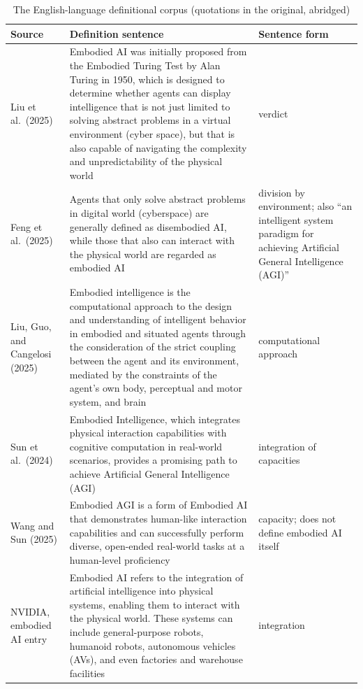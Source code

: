 \documentclass[10pt]{article}
\begin{document}
\begin{table}[htbp]
\centering
\caption{The English-language definitional corpus (quotations in the original, abridged)}
\label{tab:englishdefinitions}
\footnotesize
\begin{tabularx}{\textwidth}{>{\raggedright\arraybackslash}p{3.3cm}Y>{\raggedright\arraybackslash}p{2.6cm}}
\toprule
Source & Definition sentence & Sentence form \\
\midrule
Liu et al.\ (2025) \cite{liu2024survey} & Embodied AI was initially proposed from the Embodied Turing Test by Alan Turing in 1950, which is designed to determine whether agents can display intelligence that is not just limited to solving abstract problems in a virtual environment (cyber space), but that is also capable of navigating the complexity and unpredictability of the physical world & verdict \\
Feng et al.\ (2025) \cite{feng2025} & Agents that only solve abstract problems in digital world (cyberspace) are generally defined as disembodied AI, while those that also can interact with the physical world are regarded as embodied AI & division by environment; also ``an intelligent system paradigm for achieving Artificial General Intelligence (AGI)'' \\
Liu, Guo, and Cangelosi (2025) \cite{liu2025csur} & Embodied intelligence is the computational approach to the design and understanding of intelligent behavior in embodied and situated agents through the consideration of the strict coupling between the agent and its environment, mediated by the constraints of the agent's own body, perceptual and motor system, and brain & computational approach \\
Sun et al.\ (2024) \cite{sun2024} & Embodied Intelligence, which integrates physical interaction capabilities with cognitive computation in real-world scenarios, provides a promising path to achieve Artificial General Intelligence (AGI) & integration of capacities \\
Wang and Sun (2025) \cite{wangsung2025} & Embodied AGI is a form of Embodied AI that demonstrates human-like interaction capabilities and can successfully perform diverse, open-ended real-world tasks at a human-level proficiency & capacity; does not define embodied AI itself \\
NVIDIA, embodied AI entry \cite{nvglossary} & Embodied AI refers to the integration of artificial intelligence into physical systems, enabling them to interact with the physical world. These systems can include general-purpose robots, humanoid robots, autonomous vehicles (AVs), and even factories and warehouse facilities & integration \\

\end{tabularx}
\end{table}
\end{document}
